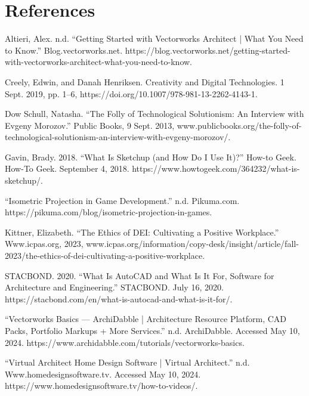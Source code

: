 \documentclass[10pt,twocolumn]{article}
\begin{document}
\section{References}
\begin{hangparas}{.25in}{1}
Altieri, Alex. n.d. “Getting Started with Vectorworks Architect | What You Need to Know.” Blog.vectorworks.net. https://blog.vectorworks.net/getting-started-with-vectorworks-architect-what-you-need-to-know.

Creely, Edwin, and Danah Henriksen. Creativity and Digital Technologies. 1 Sept. 2019, pp. 1–6, https://doi.org/10.1007/978-981-13-2262-4143-1.

Dow Schull, Natasha. “The Folly of Technological Solutionism: An Interview with Evgeny Morozov.” Public Books, 9 Sept. 2013, www.publicbooks.org/the-folly-of-technological-solutionism-an-interview-with-evgeny-morozov/.

Gavin, Brady. 2018. “What Is Sketchup (and How Do I Use It)?” How-to Geek. How-To Geek. September 4, 2018. https://www.howtogeek.com/364232/what-is-sketchup/.

“Isometric Projection in Game Development.” n.d. Pikuma.com. https://pikuma.com/blog/isometric-projection-in-games.

Kittner, Elizabeth. “The Ethics of DEI: Cultivating a Positive Workplace.” Www.icpas.org, 2023, www.icpas.org/information/copy-desk/insight/article/fall-2023/the-ethics-of-dei-cultivating-a-positive-workplace.

STACBOND. 2020. “What Is AutoCAD and What Is It For, Software for Architecture and Engineering.” STACBOND. July 16, 2020. https://stacbond.com/en/what-is-autocad-and-what-is-it-for/.

“Vectorworks Basics — ArchiDabble | Architecture Resource Platform, CAD Packs, Portfolio Markups + More Services.” n.d. ArchiDabble. Accessed May 10, 2024. https://www.archidabble.com/tutorials/vectorworks-basics.

“Virtual Architect Home Design Software | Virtual Architect.” n.d. Www.homedesignsoftware.tv. Accessed May 10, 2024. https://www.homedesignsoftware.tv/how-to-videos/.
\end{hangparas}
\end{document}
